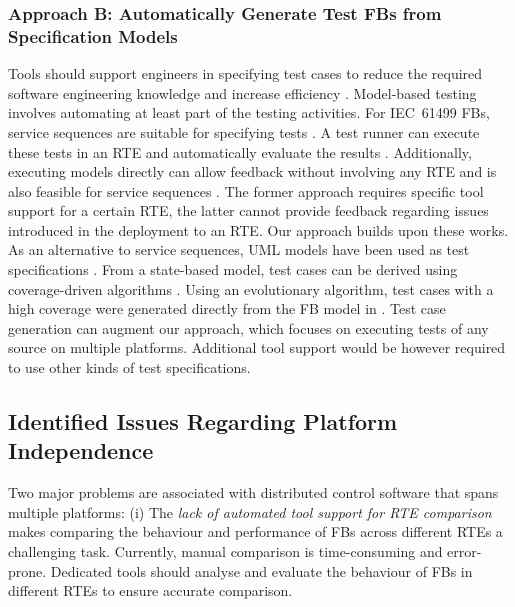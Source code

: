 \begin{bibunit}
\subsubsection{Approach B: Automatically Generate Test FBs from Specification Models}
Tools should support engineers in specifying test cases to reduce the required software engineering knowledge and increase efficiency \cite{hametner2014}. Model-based testing involves automating at least part of the testing activities. For IEC~61499 FBs, service sequences are suitable for specifying tests \cite{hametner2014}. 
A test runner can execute these tests in an RTE and automatically evaluate the results \cite{hametner2014}. Additionally, executing models directly can allow feedback without involving any RTE and is also feasible for service sequences \cite{wiesmayr2021}. The former approach requires specific tool support for a certain RTE, the latter cannot provide feedback regarding issues introduced in the deployment to an RTE. Our approach builds upon these works. 
As an alternative to service sequences, UML models have been used as test specifications \cite{Hussain.2006}. From a state-based model, test cases can be derived using coverage-driven algorithms \cite{Hussain.2006}. Using an evolutionary algorithm, test cases with a high coverage were generated directly from the FB model in \cite{Buzhinsky.2015}. Test case generation can augment our approach, which focuses on executing tests of any source on multiple platforms. Additional tool support would be however required to use other kinds of test specifications.


\subsection{Identified Issues Regarding Platform Independence}
Two major problems are associated with distributed control software that spans multiple platforms: 
(i) The \emph{lack of automated tool support for RTE comparison} makes comparing the behaviour and performance of FBs across different RTEs a challenging task. Currently, manual comparison is time-consuming and error-prone. Dedicated tools should analyse and evaluate the behaviour of FBs in different RTEs to ensure accurate comparison.


\end{bibunit}
